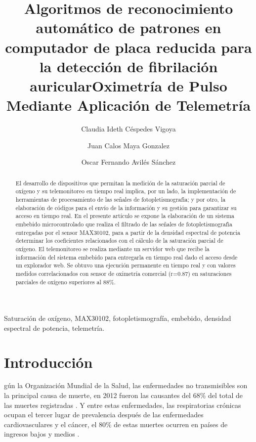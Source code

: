 \documentclass[journal]{IEEEtran}
\title{Algoritmos de reconocimiento automático de patrones en computador de placa reducida para la detección de fibrilación auricular}
\author{
Claudia Ideth Céspedes Vigoya \\ %
\and
Juan Calos Maya Gonzalez
\and

Oscar Fernando Avilés Sánchez

}
\begin{document}
\title{Oximetría de Pulso Mediante Aplicación de Telemetría}
\maketitle


\begin{abstract}
	
El desarrollo de dispositivos que permitan la medición de la saturación parcial de oxígeno y su telemonitoreo en tiempo real implica, por un lado, la implementación de herramientas de procesamiento de las señales de fotopletismografìa; y por otro, la elaboración de códigos para el envío de la información y su gestión para garantizar su acceso en tiempo real. En el presente artículo se expone la elaboración de un sistema embebido microcontrolado que realiza el filtrado de las señales de fotopletismografìa entregadas por el sensor MAX30102, para a partir de la densidad espectral de potencia determinar los coeficientes relacionados con el cálculo de la saturación parcial de oxígeno. El telemonitoreo se realiza mediante un servidor web que recibe la información del sistema embebido para entregarla en tiempo real dado el acceso desde un explorador web. Se obtuvo una ejecución permanente en tiempo real y con valores medidos correlacionados con sensor de oximetría comercial (r=0.87) en saturaciones parciales de oxígeno superiores al 88\%. 


   
\end{abstract}
\IEEEpeerreviewmaketitle

\begin{IEEEkeywords}
	Saturación de oxígeno, MAX30102, fotopletismografía, embebido, densidad espectral de potencia, telemetría.
\end{IEEEkeywords}


\section{Introducción}



gún la Organización Mundial de la Salud, las enfermedades no transmisibles son la principal causa de muerte, en 2012 fueron las causantes del 68\% del total de las muertes registradas \cite{A_OMS_informe}. Y entre estas enfermedades, las respiratorias crónicas ocupan el tercer lugar de prevalencia después de las enfermedades cardiovasculares y el cáncer, el 80\% de estas muertes ocurren en países de ingresos bajos y medios  %
\cite{A_OMS_prevencion}.
\end{document}
